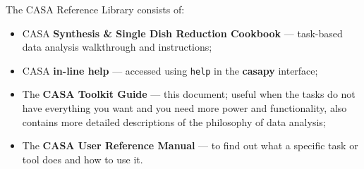 The CASA Reference Library consists of:
\begin{itemize}
   \item CASA {\bf Synthesis \& Single Dish Reduction Cookbook} --- 
     task-based data analysis walkthrough and instructions;
   \item CASA {\bf in-line help} --- accessed using {\tt help} in the 
              {\bf casapy} interface;
   \item The {\bf CASA Toolkit Guide} --- this document; useful when the 
         tasks do not have everything you want and you need more power
         and functionality, also contains more detailed descriptions
         of the philosophy of data analysis;
   \item The {\bf CASA User Reference Manual} --- 
         to find out what a specific task or tool does and how to use it.   
\end{itemize}



